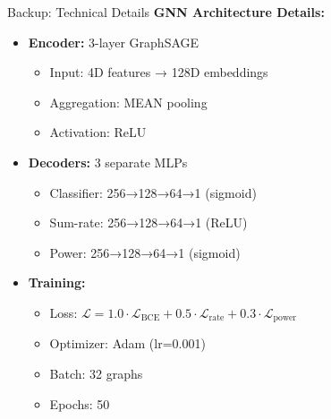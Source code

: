 \documentclass[aspectratio=169]{beamer}
\begin{document}
\begin{frame}{Backup: Technical Details}
    \textbf{GNN Architecture Details:}
    \begin{itemize}
        \item \textbf{Encoder:} 3-layer GraphSAGE
        \begin{itemize}
            \item Input: 4D features → 128D embeddings
            \item Aggregation: MEAN pooling
            \item Activation: ReLU
        \end{itemize}
        
        \item \textbf{Decoders:} 3 separate MLPs
        \begin{itemize}
            \item Classifier: 256→128→64→1 (sigmoid)
            \item Sum-rate: 256→128→64→1 (ReLU)
            \item Power: 256→128→64→1 (sigmoid)
        \end{itemize}
        
        \item \textbf{Training:}
        \begin{itemize}
            \item Loss: $\mathcal{L} = 1.0 \cdot \mathcal{L}_{\text{BCE}} + 0.5 \cdot \mathcal{L}_{\text{rate}} + 0.3 \cdot \mathcal{L}_{\text{power}}$
            \item Optimizer: Adam (lr=0.001)
            \item Batch: 32 graphs
            \item Epochs: 50
        \end{itemize}
    \end{itemize}
\end{frame}
\end{document}
